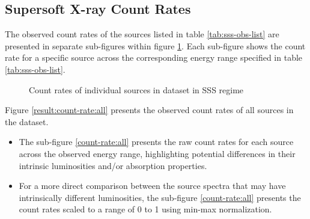		\subsection{Supersoft X-ray Count Rates}
			The observed count rates of the sources listed in table \ref{tab:sss-obs-list} are presented in separate sub-figures within figure \ref{result:count-rate:indiv}. Each sub-figure shows the count rate for a specific source across the corresponding energy range specified in table \ref{tab:sss-obs-list}.
			\begin{figure}[h!]
				\centering
				
				
				\caption{Count rates of individual sources in dataset in SSS regime}
				\label{result:count-rate:indiv}
			\end{figure}
			
			Figure \ref{result:count-rate:all} presents the observed count rates of all sources in the dataset.
			\begin{itemize}
				\item The sub-figure \ref{count-rate:all} presents the raw count rates for each source across the observed energy range, highlighting potential differences in their intrinsic luminosities and/or absorption properties.
				
				\item For a more direct comparison between the source spectra that may have intrinsically different luminosities, the sub-figure \ref{count-rate:all} presents the count rates scaled to a range of 0 to 1 using min-max normalization.%
			\end{itemize}

